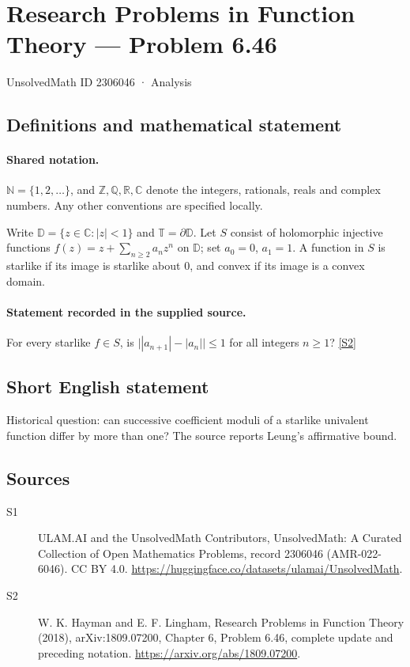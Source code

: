 \documentclass[11pt]{article}
\newcommand{\sref}[2]{\hyperlink{source:#1:#2}{[S#2]}}
\begin{document}
\setcounter{section}{2306045}
\section{Research Problems in Function Theory — Problem 6.46}\label{2306046}
{\small\sffamily UnsolvedMath ID 2306046 · Analysis}
\subsection{Definitions and mathematical statement}

\paragraph{Shared notation.}$\mathbb N=\{1,2,\ldots\}$, and $\mathbb Z,\mathbb Q,\mathbb R,\mathbb C$ denote the integers, rationals, reals and complex numbers. Any other conventions are specified locally.


Write $\mathbb D=\{z\in\mathbb C:|z|<1\}$ and $\mathbb T=\partial\mathbb D$. Let $S$ consist of holomorphic injective functions $f(z)=z+\sum_{n\ge2}a_nz^n$ on $\mathbb D$; set $a_0=0$, $a_1=1$. A function in $S$ is starlike if its image is starlike about $0$, and convex if its image is a convex domain.
\paragraph{Statement recorded in the supplied source.}
For every starlike $f\in S$, is $\big||a_{n+1}|-|a_n|\big|\le1$ for all integers $n\ge1$? \sref{2306046}{2}
\subsection{Short English statement}
Historical question: can successive coefficient moduli of a starlike univalent function differ by more than one? The source reports Leung’s affirmative bound.
\subsection{Sources}
\begin{description}
\item[\hypertarget{source:2306046:1}{S1}] ULAM.AI and the UnsolvedMath Contributors, UnsolvedMath: A Curated Collection of Open Mathematics Problems, record 2306046 (AMR-022-6046). CC BY 4.0. \url{https://huggingface.co/datasets/ulamai/UnsolvedMath}.
\item[\hypertarget{source:2306046:2}{S2}] W. K. Hayman and E. F. Lingham, Research Problems in Function Theory (2018), arXiv:1809.07200, Chapter 6, Problem 6.46, complete update and preceding notation. \url{https://arxiv.org/abs/1809.07200}.
\end{description}
\label{end:2306046}
\end{document}
